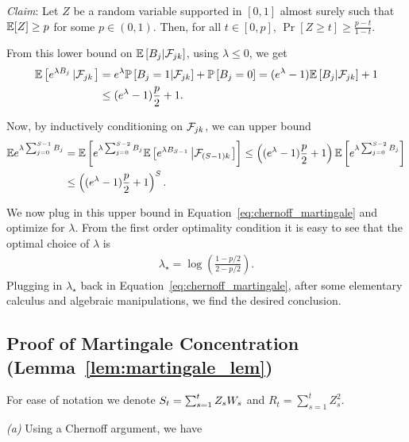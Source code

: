 \emph{Claim}: Let $Z$ be a random variable supported in $[0,1]$ almost surely such that $\mathbb{E}[Z] \geq p$ for some $p \in (0,1)$. Then, for all $t \in [0,p]$, $\Pr[Z \geq t] \geq \frac{p - t}{1 - t}$.

From this lower bound on $\mathbb{E} \left[B_{j} |\mathcal{F}_{jk}\right]$, using $\lambda \leq 0$, we get
\begin{align*}
\mathbb{E} \left[e^{\lambda B_j}\left| \mathcal{F}_{jk}\right. \right] &= e^\lambda \mathbb{P}\left[ B_j = 1| \mathcal{F}_{jk}\right] + \mathbb{P}\left[B_j = 0\right] = (e^\lambda - 1)\mathbb{E} \left[ B_j |\mathcal{F}_{jk}\right] + 1\\
&\leq (e^\lambda - 1)\frac{p}{2} + 1.
\end{align*}

Now, by inductively conditioning on $\mathcal{F}_{jk}$, we can upper bound
\begin{align*}
\mathbb{E} e^{\lambda \sum_{j = 0}^{S - 1}B_j} &= \mathbb{E} \left[e^{\lambda \sum_{j = 0}^{S - 2}B_j}\mathbb{E} \left[ e^{\lambda B_{S - 1}}    \left| \mathcal{F}_{(S - 1)k}\right.\right]\right] \leq \left((e^\lambda - 1)\frac{p}{2} + 1\right)\mathbb{E} \left[e^{\lambda \sum_{j = 0}^{S - 2}B_j}\right]\\
&\leq \left((e^\lambda - 1)\frac{p}{2} + 1\right)^{S}.
\end{align*}

We now plug in this upper bound in Equation~\ref{eq:chernoff_martingale} and optimize for $\lambda$. From the first order optimality condition it is easy to see that the optimal choice of $\lambda$ is
\begin{align*}
\lambda_\star = \log \left(\frac{1 - p/2}{2 - p/2}\right).
\end{align*}
Plugging in $\lambda_\star$ back in Equation~\ref{eq:chernoff_martingale}, after some elementary calculus and algebraic manipulations, we find the desired conclusion.


\subsection{Proof of Martingale Concentration (Lemma~\ref{lem:martingale_lem})\label{proof:lem_martingale}}
	For ease of notation we denote $S_t = \sum_{s = 1}^t Z_s W_s$ and $R_t = \sum_{s = 1}^t Z_s^2$.

	\emph{(a) } Using a Chernoff argument,  we have

